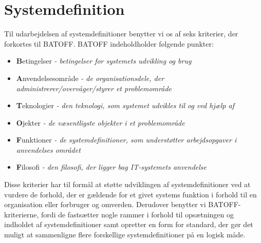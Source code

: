 \section{Systemdefinition}
\label{sec:systemdefinition}

Til udarbejdelsen af systemdefinitioner benytter vi os af seks kriterier, der forkortes til BATOFF. \cite[s.~37]{ooad} BATOFF indeholdholder følgende punkter: 

\begin{itemize}[noitemsep]
\item \textbf{B}etingelser \textit{- betingelser for systemets udvikling og brug}
\item \textbf{A}nvendelsesområde \textit{- de organisationsdele, der administrerer/overvåger/styrer et problemområde}
\item \textbf{T}eknologier \textit{- den teknologi, som systemet udvikles til og ved hjælp af}
\item \textbf{O}jekter \textit{- de væsentligste objekter i et problemområde}
\item \textbf{F}unktioner \textit{- de systemdefinitioner, som understøtter arbejdsopgaver i anvendelses området}
\item \textbf{F}ilosofi \textit{- den filosofi, der ligger bag IT-systemets anvendelse}
\end{itemize}

Disse kriterier har til formål at støtte udviklingen af systemdefinitioner ved at vurdere de forhold, der er gældende for et givet systems funktion i forhold til en organisation eller forbruger og omverden. Derudover benytter vi BATOFF-kriterierne, fordi de fastsætter nogle rammer i forhold til opsætningen og indholdet af systemdefinitioner samt opretter en form for standard, der gør det muligt at sammenligne flere forskellige systemdefinitioner på en logisk måde.



